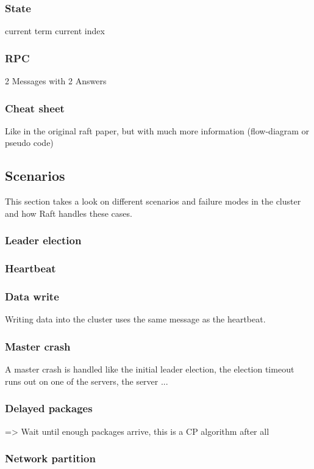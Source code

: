 \subsubsection{State}
current term
current index

\subsubsection{RPC}
2 Messages with 2 Answers

\subsubsection{Cheat sheet}
Like in the original raft paper, but with much more information (flow-diagram or pseudo code)


\subsection{Scenarios}
This section takes a look on different scenarios and failure modes in the cluster and how Raft handles these cases.

\subsubsection{Leader election}

\subsubsection{Heartbeat}

\subsubsection{Data write}
Writing data into the cluster uses the same message as the heartbeat.


\subsubsection{Master crash}
A master crash is handled like the initial leader election, the election timeout runs out on one of the servers, the server ...

\subsubsection{Delayed packages}
=> Wait until enough packages arrive, this is a CP algorithm after all

\subsubsection{Network partition}

